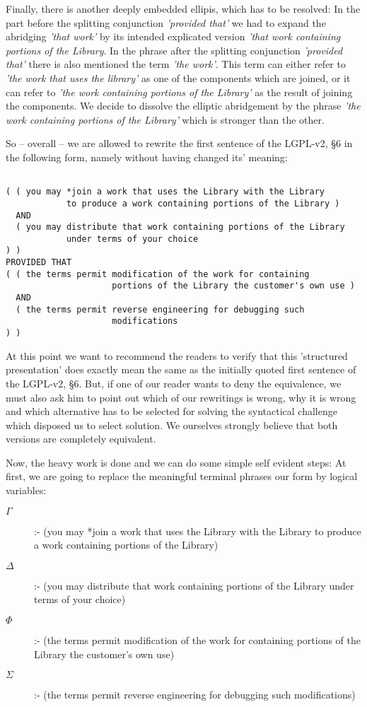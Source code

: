 Finally, there is another deeply embedded ellipis, which has to be resolved: In
the part before the splitting conjunction \emph{'provided that'} we had to
expand the abridging \emph{'that work'} by its intended explicated version
\emph{'that work containing portions of the Library}. In the phrase after the
splitting conjunction \emph{'provided that'} there is also mentioned the term
\emph{'the work'}. This term can either refer to \emph{'the work that uses the
library'} as one of the components which are joined, or it can refer to
\emph{'the work containing portions of the Library'} as the result of joining
the components. We decide to dissolve the elliptic abridgement by the phrase
\emph{'the work containing portions of the Library'} which is stronger than the
other.

So -- overall -- we are allowed to rewrite the first sentence of the LGPL-v2, §6
in the following form, namely without having changed its' meaning:

\begin{verbatim}

( ( you may *join a work that uses the Library with the Library
            to produce a work containing portions of the Library )
  AND 
  ( you may distribute that work containing portions of the Library
            under terms of your choice 
) )
PROVIDED THAT
( ( the terms permit modification of the work for containing 
                     portions of the Library the customer's own use )
  AND
  ( the terms permit reverse engineering for debugging such
                     modifications     
) )
\end{verbatim}

At this point we want to recommend the readers to verify that this 'structured
presentation' does exactly mean the same as the initially quoted first sentence
of the LGPL-v2, §6. But, if one of our reader wants to deny the equivalence, we
must also ask him to point out which of our rewritings is wrong, why it is wrong
and which alternative has to be selected for solving the syntactical challenge
which disposed us to select solution. We ourselves strongly believe that both
versions are completely equivalent.

Now, the heavy work is done and we can do some simple self evident steps: At
first, we are going to replace the meaningful terminal phrases our form by
logical variables:
\begin{description}
  \item[$\Gamma$] :- (you may *join a work that uses the Library with the
  Library to produce a work containing portions of the Library)
  \item[$\Delta$] :- (you may distribute that work containing portions of the
  Library under terms of your choice)
  \item[$\Phi$] :- (the terms permit modification of the work for containing
  portions of the Library the customer's own use)
  \item[$\Sigma$] :- (the terms permit reverse engineering for debugging such
  modifications)
\end{description}

